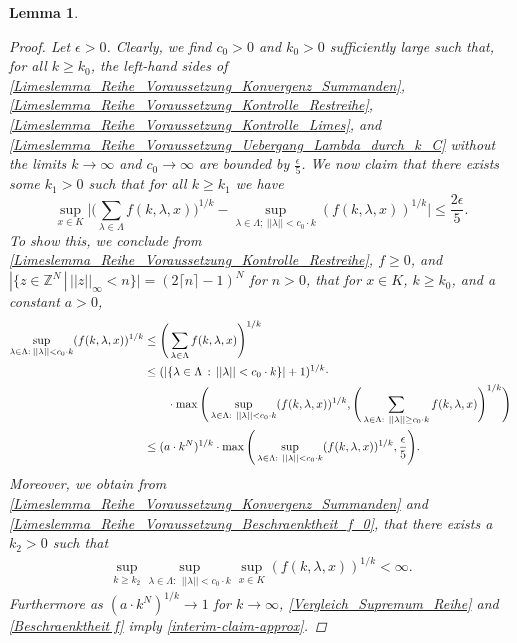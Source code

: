 \documentclass[reqno]{amsart}
\theoremstyle{plain}
\newtheorem{lemma}[theorem]{Lemma}
\theoremstyle{definition}
\numberwithin{equation}{section}
\newcommand{\Z}{\mathbb{Z}}
\newcommand{\ra}{\rightarrow}
\begin{document}
\begin{lemma}
\begin{proof}
  Let $\epsilon>0$. Clearly,
we find  $c_0>0$ and $k_0>0$
sufficiently large such that, for all $k \geq k_0$,  the left-hand sides of
\eqref{Limeslemma_Reihe_Voraussetzung_Konvergenz_Summanden},
\eqref{Limeslemma_Reihe_Voraussetzung_Kontrolle_Restreihe},
\eqref{Limeslemma_Reihe_Voraussetzung_Kontrolle_Limes}, and 
\eqref{Limeslemma_Reihe_Voraussetzung_Uebergang_Lambda_durch_k_C}
without the limits $k\to\infty$ and $c_0\to\infty$ are bounded by
 $\frac{\epsilon}{5}$.
We  now claim that  there exists some $k_1>0$ such that for all $ k \geq k_1$ we have
\begin{equation}\label{interim-claim-approx}
\sup\limits_{x \in K} 
\Bigg|
\Bigg( \sum\limits_{\lambda\in\Lambda} f(k,\lambda,x) \Bigg)^{1/k}
-
\sup\limits_{\lambda \in \Lambda ;\> ||\lambda|| < c_0 \cdot k} (f(k,\lambda,x))^{1/k}
\Bigg|
\leq
\frac{2\epsilon}{5}.
\end{equation}
To show this, we conclude from \eqref{Limeslemma_Reihe_Voraussetzung_Kontrolle_Restreihe}, $f \geq 0$, and
$|\{z \in \Z^N \, | \, ||z||_{\infty} < n\}|=(2 \lceil n \rceil-1)^N$ for $n > 0$, that
for $x \in K$, $k \geq k_0$, and a constant $a>0$,
\begin{align}
 \sup\limits_{\lambda \in \Lambda:\> ||\lambda|| < c_0 \cdot k} (f(k,\lambda,x))^{1/k}
&\leq
\Bigg( \sum\limits_{\lambda\in\Lambda} f(k,\lambda,x) \Bigg)^{1/k} \notag \\ \notag
&\leq
(|\{\lambda \in \Lambda \, : \, ||\lambda|| < c_0 \cdot k \} | + 1)^{1/k}
\cdot \\ &\quad\quad\cdot \max\Bigg( 
\sup\limits_{\lambda \in \Lambda : \>\> ||\lambda|| < c_0 \cdot k} (f(k,\lambda,x))^{1/k},
\Bigg( \sum\limits_{\lambda\in\Lambda : \>\> ||\lambda|| \geq c_0 \cdot k} f(k,\lambda,x) \Bigg)^{1/k}
\Bigg) \notag\\
&\leq (a \cdot k^N)^{1/k} \cdot \max\Bigg( \sup\limits_{\lambda \in \Lambda: \>\>||\lambda|| < c_0 \cdot k} (f(k,\lambda,x))^{1/k}, \frac{\epsilon}{5} \Bigg). \label{Vergleich_Supremum_Reihe}
\end{align}
Moreover, we obtain from 
\eqref{Limeslemma_Reihe_Voraussetzung_Konvergenz_Summanden} and
\eqref{Limeslemma_Reihe_Voraussetzung_Beschraenktheit_f_0}, that there exists a $k_2>0$ such that
\begin{align}
\sup\limits_{k \geq k_2} \sup\limits_{\lambda \in \Lambda : \>\> ||\lambda|| < c_0 \cdot k} \sup\limits_{x \in K} (f(k,\lambda,x))^{1/k} < \infty. \label{Beschraenktheit f}
\end{align}
Furthermore as $(a \cdot k^N)^{1/k} \ra 1$ for $k \to \infty$, \eqref{Vergleich_Supremum_Reihe} and \eqref{Beschraenktheit f} imply \eqref{interim-claim-approx}.


\end{proof}
\end{lemma}
\end{document}
